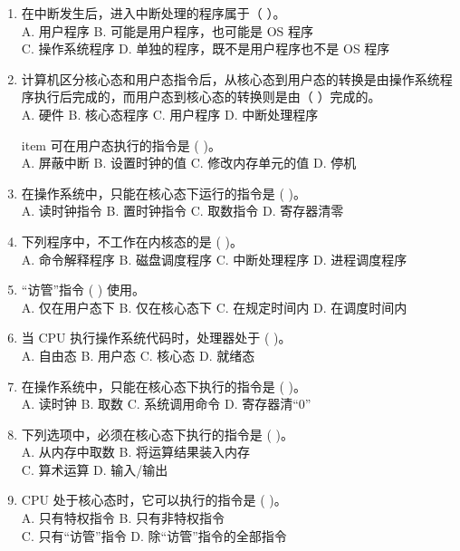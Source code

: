 \documentclass[lang=cn,newtx,10pt,scheme=chinese]{../../elegantbook}
\begin{document}
\begin{enumerate}
  \item 在中断发生后，进入中断处理的程序属于（ ）。\\
  A. 用户程序 \quad B. 可能是用户程序，也可能是 OS 程序\\
  C. 操作系统程序 \quad D. 单独的程序，既不是用户程序也不是 OS 程序

  \item 计算机区分核心态和用户态指令后，从核心态到用户态的转换是由操作系统程序执行后完成的，而用户态到核心态的转换则是由（ ）完成的。\\
  A. 硬件 \quad B. 核心态程序 \quad C. 用户程序 \quad D. 中断处理程序

  item 可在用户态执行的指令是 (    )。\\
    A. 屏蔽中断 \quad B. 设置时钟的值 \quad C. 修改内存单元的值 \quad D. 停机

    \item 在操作系统中，只能在核心态下运行的指令是 (    )。\\
    A. 读时钟指令 \quad B. 置时钟指令 \quad C. 取数指令 \quad D. 寄存器清零

    \item 下列程序中，不工作在内核态的是 (    )。\\
    A. 命令解释程序 \quad B. 磁盘调度程序 \quad C. 中断处理程序 \quad D. 进程调度程序

    \item “访管”指令 (    ) 使用。\\
    A. 仅在用户态下 \quad B. 仅在核心态下 \quad C. 在规定时间内 \quad D. 在调度时间内

    \item 当 CPU 执行操作系统代码时，处理器处于 (    )。\\
    A. 自由态 \quad B. 用户态 \quad C. 核心态 \quad D. 就绪态

    \item 在操作系统中，只能在核心态下执行的指令是 (    )。\\
    A. 读时钟 \quad B. 取数 \quad C. 系统调用命令 \quad D. 寄存器清“0”

    \item 下列选项中，必须在核心态下执行的指令是 (    )。\\
    A. 从内存中取数 \quad B. 将运算结果装入内存\\
    C. 算术运算 \quad D. 输入/输出

    \item CPU 处于核心态时，它可以执行的指令是 (    )。\\
    A. 只有特权指令 \quad B. 只有非特权指令\\
    C. 只有“访管”指令 \quad D. 除“访管”指令的全部指令


\end{enumerate}
\end{document}
